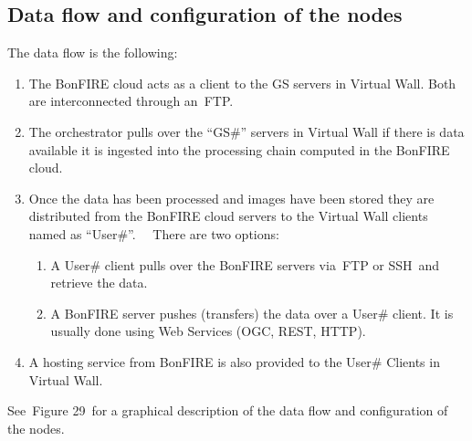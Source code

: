 \documentclass[a4paper]{article}
\newcounter{saveenum}
\newcommand\liststyleLFOxxxv{%
\renewcommand\theenumi{\arabic{enumi}}
\renewcommand\theenumii{\alph{enumii}}
\renewcommand\theenumiii{\roman{enumiii}}
\renewcommand\theenumiv{\arabic{enumiv}}
\renewcommand\labelenumi{\theenumi.}
\renewcommand\labelenumii{\theenumii.}
\renewcommand\labelenumiii{\theenumiii.}
\renewcommand\labelenumiv{\theenumiv.}
}
\begin{document}
\bigskip


\bigskip

\subsection[Data flow and configuration of the nodes]{Data flow and
configuration of the nodes}
\hypertarget{Toc381777227}{}
\bigskip

The data flow is the following:

\liststyleLFOxxxv
\setcounter{saveenum}{\value{enumi}}
\begin{enumerate}
\setcounter{enumi}{\value{saveenum}}
\item The BonFIRE cloud acts as a client to the GS servers in Virtual
Wall. Both are interconnected through an\ FTP.
\item The orchestrator pulls over the
{\textquotedblleft}GS\#{\textquotedblright} servers in Virtual Wall if
there is data available it is ingested into the processing chain
computed in the BonFIRE cloud.
\item Once the data has been processed and images have been stored they
are distributed from the BonFIRE cloud servers to the Virtual Wall
clients named as {\textquotedblleft}User\#{\textquotedblright}.
\ \ There are two options:

\setcounter{saveenum}{\value{enumii}}
\begin{enumerate}
\setcounter{enumii}{\value{saveenum}}
\item A User\# client pulls over the BonFIRE servers via\ FTP or
SSH\ and retrieve the data.
\item A BonFIRE server pushes (transfers) the data over a User\# client.
It is usually done using Web Services (OGC, REST, HTTP).\ 
\end{enumerate}
\item A hosting service from BonFIRE is also provided to the User\#
Clients in Virtual Wall.
\end{enumerate}
See\ Figure 29\ for a graphical description of the data flow and
configuration of the nodes.


\bigskip
\end{document}
